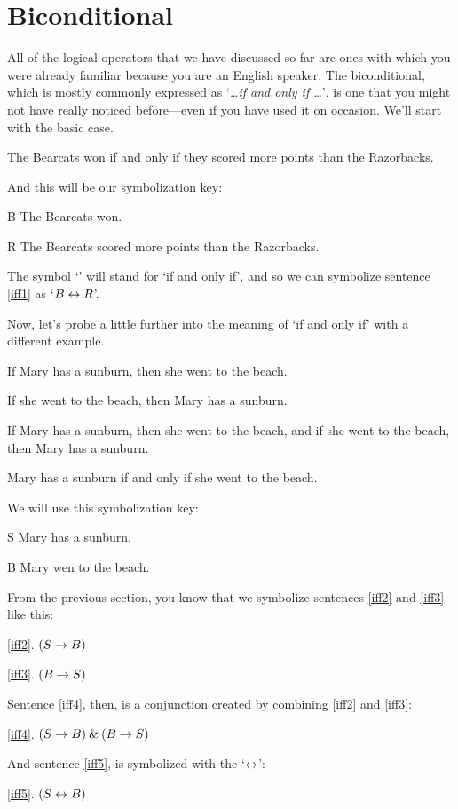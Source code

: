 \section{Biconditional}\label{s:biconditional-1}

All of the logical operators that we have discussed so far are ones with which you were already familiar because you are an English speaker. The biconditional, which is mostly commonly expressed as `\textit{\ldots if and only if \ldots}', is one that you might not have really noticed before---even if you have used it on occasion. We'll start with the basic case.
	\begin{earg}
		\item[\ex{iff1}] The Bearcats won if and only if they scored more points than the Razorbacks.
	\end{earg}
And this will be our symbolization key:
	\begin{ekey}
		\item[B] The Bearcats won.
		\item[R] The Bearcats scored more points than the Razorbacks.
	\end{ekey}
The symbol `\eiff' will stand for `if and only if', and so we can symbolize sentence \ref{iff1} as `$B \leftrightarrow R$'.

Now, let's probe a little further into the meaning of `if and only if' with a different example.
	\begin{earg}
		\item[\ex{iff2}] If Mary has a sunburn, then she went to the beach.
		\item[\ex{iff3}] If she went to the beach, then Mary has a sunburn. 
		\item[\ex{iff4}] If Mary has a sunburn, then she went to the beach, and if she went to the beach, then Mary has a sunburn.
		\item[\ex{iff5}] Mary has a sunburn if and only if she went to the beach.
	\end{earg}
We will use this symbolization key:
	\begin{ekey}
		\item[S] Mary has a sunburn.
		\item[B] Mary wen to the beach.
	\end{ekey}
From the previous section, you know that we symbolize sentences \ref{iff2} and \ref{iff3} like this:
	\begin{earg}
		\item[\ref{iff2}.] $(S \rightarrow B)$
		\item[\ref{iff3}.] $(B \rightarrow S)$ 
	\end{earg}
Sentence \ref{iff4}, then, is a conjunction created by combining \ref{iff2} and \ref{iff3}: 
	\begin{earg}
		\item[\ref{iff4}.] $(S \rightarrow B) \mathbin{\&} (B \rightarrow S)$
 	\end{earg}
And sentence \ref{iff5}, is symbolized with the `$\leftrightarrow$':
	\begin{earg}
		\item[\ref{iff5}.] $(S \leftrightarrow B)$
	\end{earg}


